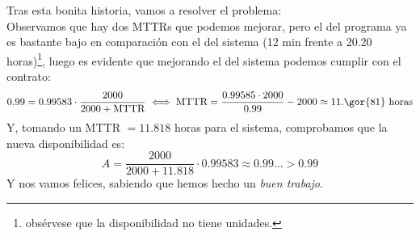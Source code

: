 \begin{problem}[6]
Tras esta bonita historia, vamos a resolver el problema:\\
Observamos que hay dos MTTRs que podemos mejorar, pero el del programa ya es bastante bajo en comparación con el del sistema (12 min frente a 20.20 horas)\footnote{obsérvese que la disponibilidad no tiene unidades.}, luego es evidente que mejorando el del sistema podemos cumplir con el contrato:
\[ 0.99 = 0.99583 \cdot \frac{2000}{2000+\text{MTTR}} \iff \text{MTTR} = \frac{0.99585 \cdot 2000}{0.99} - 2000 \approx 11.\gor{81} \text{ horas}\]
Y, tomando un MTTR $=11.818$ horas para el sistema, comprobamos que la nueva disponibilidad es:
\[ A = \frac{2000}{2000+11.818} \cdot 0.99583 \approx 0.99... > 0.99 \]
Y nos vamos felices, sabiendo que hemos hecho un \textit{buen trabajo}.

\end{problem}


